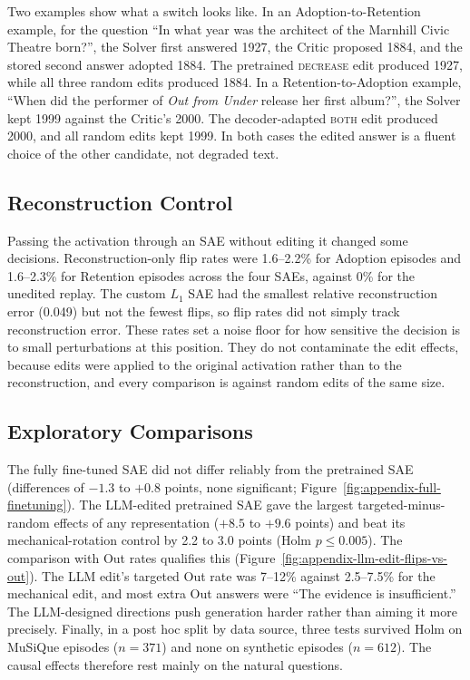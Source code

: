Two examples show what a switch looks like. In an Adoption-to-Retention
example, for the question ``In what year was the architect of the Marnhill
Civic Theatre born?'', the Solver first answered 1927, the Critic proposed
1884, and the stored second answer adopted 1884. The pretrained
\textsc{decrease} edit produced 1927, while all three random edits produced
1884. In a Retention-to-Adoption example, ``When did the performer of
\emph{Out from Under} release her first album?'', the Solver kept 1999 against
the Critic's 2000. The decoder-adapted \textsc{both} edit produced 2000, and
all random edits kept 1999. In both cases the edited answer is a fluent choice
of the other candidate, not degraded text.

\subsection{Reconstruction Control}

Passing the activation through an SAE without editing it changed some
decisions. Reconstruction-only flip rates were 1.6--2.2\% for Adoption
episodes and 1.6--2.3\% for Retention episodes across the four SAEs, against
0\% for the unedited replay. The custom $L_1$ SAE had the smallest relative
reconstruction error (0.049) but not the fewest flips, so flip rates did not
simply track reconstruction error. These rates set a noise floor for how
sensitive the decision is to small perturbations at this position. They do
not contaminate the edit effects, because edits were applied to the original
activation rather than to the reconstruction, and every comparison is
against random edits of the same size.

\subsection{Exploratory Comparisons}

The fully fine-tuned SAE did not differ reliably from the pretrained SAE
(differences of $-1.3$ to $+0.8$ points, none significant;
Figure~\ref{fig:appendix-full-finetuning}). The LLM-edited pretrained SAE
gave the largest targeted-minus-random effects of any representation
($+8.5$ to $+9.6$ points) and beat its mechanical-rotation control by 2.2 to
3.0 points (Holm $p\le0.005$). The comparison with Out rates qualifies this
(Figure~\ref{fig:appendix-llm-edit-flips-vs-out}). The LLM edit's targeted Out
rate was 7--12\% against 2.5--7.5\% for the mechanical edit, and most extra Out
answers were ``The evidence is insufficient.'' The LLM-designed directions
push generation harder rather than aiming it more precisely. Finally, in a
post hoc split by data source, three tests survived Holm on MuSiQue episodes
($n=371$) and none on synthetic episodes ($n=612$). The causal effects
therefore rest mainly on the natural questions.


